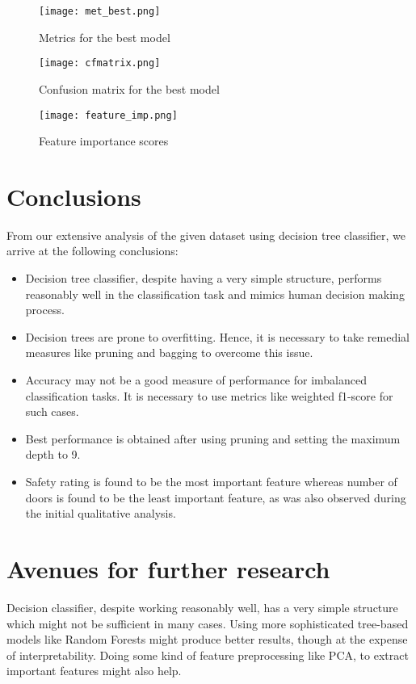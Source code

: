 \documentclass[conference]{IEEEtran}
\begin{document}
\begin{figure}[tbh]
\centering
\texttt{[image: met\_best.png]}
\caption{Metrics for the best model }
\label{met_best}
\end{figure}

\begin{figure}[tbh]
\centering
\texttt{[image: cfmatrix.png]}
\caption{Confusion matrix for the best model}
\label{cf_matrix}
\end{figure}

\begin{figure}[tbh]
\centering
\texttt{[image: feature\_imp.png]}
\caption{Feature importance scores}
\label{feature_imp}
\end{figure}


\section{Conclusions}

From our extensive analysis of the given dataset using decision tree classifier, we arrive at the following conclusions:

\begin{itemize}
    \item Decision tree classifier, despite having a very simple structure, performs reasonably well in the classification task and mimics human decision making process. 
    \item Decision trees are prone to overfitting. Hence, it is necessary to take remedial measures like pruning and bagging to overcome this issue.
    \item Accuracy may not be a good measure of performance for imbalanced classification tasks. It is necessary to use metrics like weighted f1-score for such cases.
    \item Best performance is obtained after using pruning and setting the maximum depth to 9.
    \item Safety rating is found to be the most important feature whereas number of doors is found to be the least important feature, as was also observed during the initial qualitative analysis.
\end{itemize}



\section{Avenues for further research}

Decision classifier, despite working reasonably well, has a very simple structure which might not be sufficient in many cases. Using more sophisticated tree-based models like Random Forests might produce better results, though at the expense of interpretability. Doing some kind of feature preprocessing like PCA, to extract important features might also help. 



\nocite{*} %

\end{document}
